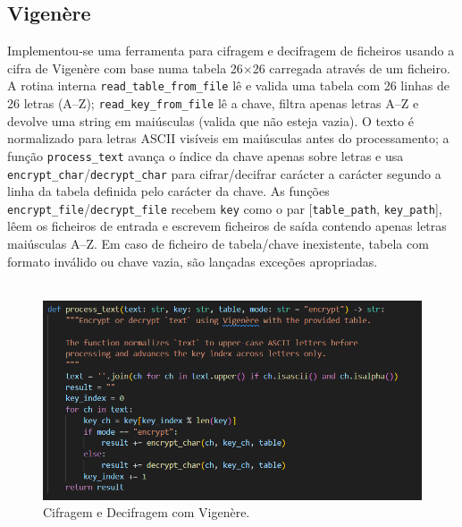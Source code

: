 \documentclass[a4paper]{article}
\begin{document}
\subsection{Vigenère}
Implementou‑se uma ferramenta para cifragem e decifragem de ficheiros usando a cifra de Vigenère com base numa tabela 26×26 carregada através de um ficheiro.
A rotina interna \texttt{read\_table\_from\_file} lê e valida uma tabela com 26 linhas de 26 letras (A–Z);
\texttt{read\_key\_from\_file} lê a chave, filtra apenas letras A–Z e devolve uma string em maiúsculas (valida que não esteja vazia).
O texto é normalizado para letras ASCII visíveis em maiúsculas antes do processamento;
a função \texttt{process\_text} avança o índice da chave apenas sobre letras e usa \texttt{encrypt\_char}/\texttt{decrypt\_char} para cifrar/decifrar carácter a carácter segundo a
linha da tabela definida pelo carácter da chave. As funções \texttt{encrypt\_file}/\texttt{decrypt\_file} recebem \texttt{key} como o par [\texttt{table\_path}, \texttt{key\_path}],
lêem os ficheiros de entrada e escrevem ficheiros de saída contendo apenas letras maiúsculas A–Z. Em caso de ficheiro de tabela/chave inexistente,
tabela com formato inválido ou chave vazia, são lançadas exceções apropriadas.\\\\

\begin{figure}[H]
	\centering
	\includegraphics[width=\textwidth]{Recursos/vigenere.png}
	\caption{Cifragem e Decifragem com Vigenère.}
	\label{fig:vigenere}
\end{figure}

\newpage
\end{document}
